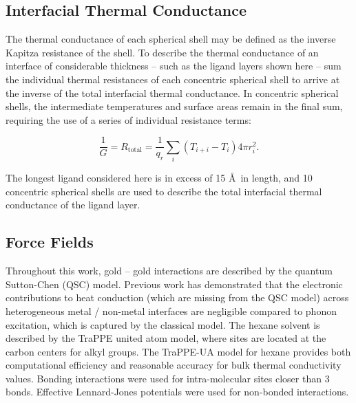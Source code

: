 \subsection{Interfacial Thermal Conductance}

The thermal conductance of each spherical shell may be defined as the inverse
Kapitza resistance of the shell.\cite{Stocker:2014qq}
To describe the thermal conductance
of an interface of considerable thickness -- such as the ligand layers
shown here -- sum the individual thermal resistances of each
concentric spherical shell to arrive at the inverse of the total
interfacial thermal conductance. 
In concentric spherical shells, the
intermediate temperatures and surface areas remain in the final sum,
requiring the use of a series of individual resistance terms:

\begin{equation}
  \frac{1}{G} = R_\mathrm{total} = \frac{1}{q_r} \sum_i \left(T_{i+i} -
    T_i\right) 4 \pi r_i^2.
\end{equation}

The longest ligand considered here is in excess of 15 \AA\ in length,
and 10 concentric spherical shells are used to describe the total
interfacial thermal conductance of the ligand layer.

\subsection{Force Fields}

Throughout this work, gold -- gold interactions are described by the
quantum Sutton-Chen (QSC) model.\cite{Qi:1999ph} Previous
work\cite{Kuang:2011ef} has demonstrated that the electronic
contributions to heat conduction (which are missing from the QSC
model) across heterogeneous metal / non-metal interfaces are
negligible compared to phonon excitation, which is captured by the
classical model. The hexane solvent is described by the TraPPE united
atom model,\cite{TraPPE-UA.alkanes} where sites are located at the
carbon centers for alkyl groups. The TraPPE-UA model for hexane
provides both computational efficiency and reasonable accuracy for
bulk thermal conductivity values. Bonding interactions were used for
intra-molecular sites closer than 3 bonds. Effective Lennard-Jones
potentials were used for non-bonded interactions.


